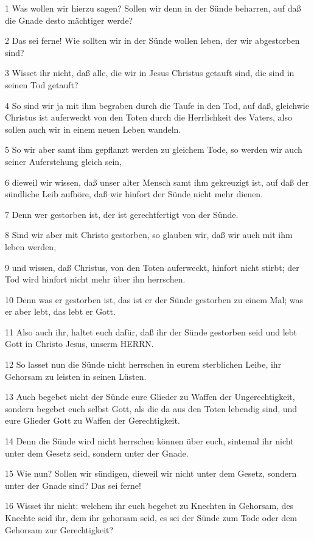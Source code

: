 \par 1 Was wollen wir hierzu sagen? Sollen wir denn in der Sünde beharren, auf daß die Gnade desto mächtiger werde?
\par 2 Das sei ferne! Wie sollten wir in der Sünde wollen leben, der wir abgestorben sind?
\par 3 Wisset ihr nicht, daß alle, die wir in Jesus Christus getauft sind, die sind in seinen Tod getauft?
\par 4 So sind wir ja mit ihm begraben durch die Taufe in den Tod, auf daß, gleichwie Christus ist auferweckt von den Toten durch die Herrlichkeit des Vaters, also sollen auch wir in einem neuen Leben wandeln.
\par 5 So wir aber samt ihm gepflanzt werden zu gleichem Tode, so werden wir auch seiner Auferstehung gleich sein,
\par 6 dieweil wir wissen, daß unser alter Mensch samt ihm gekreuzigt ist, auf daß der sündliche Leib aufhöre, daß wir hinfort der Sünde nicht mehr dienen.
\par 7 Denn wer gestorben ist, der ist gerechtfertigt von der Sünde.
\par 8 Sind wir aber mit Christo gestorben, so glauben wir, daß wir auch mit ihm leben werden,
\par 9 und wissen, daß Christus, von den Toten auferweckt, hinfort nicht stirbt; der Tod wird hinfort nicht mehr über ihn herrschen.
\par 10 Denn was er gestorben ist, das ist er der Sünde gestorben zu einem Mal; was er aber lebt, das lebt er Gott.
\par 11 Also auch ihr, haltet euch dafür, daß ihr der Sünde gestorben seid und lebt Gott in Christo Jesus, unserm HERRN.
\par 12 So lasset nun die Sünde nicht herrschen in eurem sterblichen Leibe, ihr Gehorsam zu leisten in seinen Lüsten.
\par 13 Auch begebet nicht der Sünde eure Glieder zu Waffen der Ungerechtigkeit, sondern begebet euch selbst Gott, als die da aus den Toten lebendig sind, und eure Glieder Gott zu Waffen der Gerechtigkeit.
\par 14 Denn die Sünde wird nicht herrschen können über euch, sintemal ihr nicht unter dem Gesetz seid, sondern unter der Gnade.
\par 15 Wie nun? Sollen wir sündigen, dieweil wir nicht unter dem Gesetz, sondern unter der Gnade sind? Das sei ferne!
\par 16 Wisset ihr nicht: welchem ihr euch begebet zu Knechten in Gehorsam, des Knechte seid ihr, dem ihr gehorsam seid, es sei der Sünde zum Tode oder dem Gehorsam zur Gerechtigkeit?
